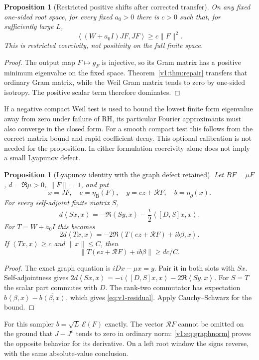 \documentclass[11pt]{article}
\newtheorem{proposition}[theorem]{Proposition}
\theoremstyle{remark}
\newcommand{\ip}[2]{\left\langle #1,#2\right\rangle}
\newcommand{\Jc}{J^{\mathrm c}}
\begin{document}
\begin{proposition}[Restricted positive shifts after corrected transfer]\label{prop:v1-shift}
On any fixed one-sided root space, for every fixed $a_0>0$ there is
$c>0$ such that, for sufficiently large $L$,
\[
 \ip{(W+a_0I)JF}{JF}\ge c\|F\|^2.
\]
This is restricted coercivity, not positivity on the full finite space.
\end{proposition}
\begin{proof}
The output map $F\mapsto g_F$ is injective, so its Gram matrix has a
positive minimum eigenvalue on the fixed space. Theorem~\ref{v1:thm:repair}
transfers that ordinary Gram matrix, while the Weil Gram matrix tends to
zero by one-sided isotropy. The positive scalar term therefore dominates.
\end{proof}
If a negative compact Weil test is used to bound the lowest finite form
eigenvalue away from zero under failure of RH, its particular Fourier
approximants must also converge in the closed form. For a smooth compact
test this follows from the correct matrix bound and rapid coefficient
decay. This optional calibration is not needed for the proposition.
In either formulation coercivity alone does not imply a small Lyapunov defect.

\begin{proposition}[Lyapunov identity with the graph defect retained]\label{prop:v1-lyapunov}
Let $BF=\mu F$, $d=\Re\mu>0$, $\|F\|=1$, and put
\[
 x=JF,\quad e=\eta_{\mathrm B}(F),\quad
 y=e z+\mathcal RF,\quad b=\eta_\partial(x).
\]
For every self-adjoint finite matrix $S$,
\begin{equation}\label{eq:v1-general-metric}
 d\ip{Sx}{x}
 =-\Re\ip{Sy}{x}-\frac{i}{2}\ip{[D,S]x}{x}.
\end{equation}
For $T=W+a_0I$ this becomes
\begin{equation}\label{eq:v1-residual}
 2d\ip{Tx}{x}=-2\Re\ip{T(ez+\mathcal RF)+ib\beta}{x}.
\end{equation}
If $\ip{Tx}{x}\ge c$ and $\|x\|\le C$, then
\[
 \|T(ez+\mathcal RF)+ib\beta\|\ge dc/C.
\]
\end{proposition}
\begin{proof}
The exact graph equation is $iDx-\mu x=y$. Pair it in both slots
with $Sx$. Self-adjointness gives
$2d\ip{Sx}{x}=-i\ip{[D,S]x}{x}-2\Re\ip{Sy}{x}$.
For $S=T$ the scalar part commutes with $D$. The rank-two commutator
has expectation $b\ip{\beta}{x}-\overline{b\ip{\beta}{x}}$,
which gives \eqref{eq:v1-residual}. Apply Cauchy--Schwarz for the bound.
\end{proof}
For this sampler $b=\sqrt L\,\mathscr E(F)$ exactly. The vector
$\mathcal RF$ cannot be omitted on the ground that $J-\Jc$ tends to zero
in ordinary norm: \eqref{v1:eq:graphnorm} proves the opposite behavior
for its derivative. On a left root window the signs reverse, with the
same absolute-value conclusion.
\end{document}
